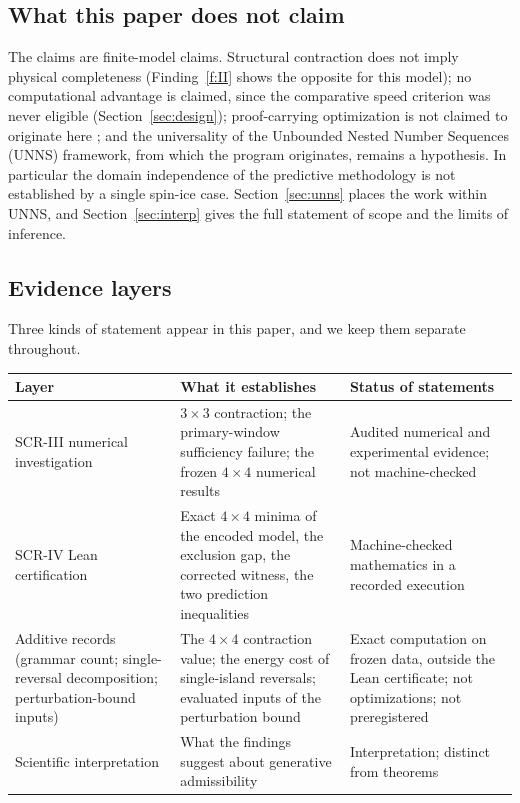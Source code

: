 \documentclass[11pt,a4paper]{article}
\theoremstyle{plain}
\theoremstyle{definition}
\theoremstyle{remark}
\begin{document}
\subsection{What this paper does not claim}
The claims are finite-model claims. Structural contraction does not imply physical completeness (Finding~\ref{f:II} shows the opposite for this model); no computational advantage is claimed, since the comparative speed criterion was never eligible (Section~\ref{sec:design}); proof-carrying optimization is not claimed to originate here \cite{Necula1997}; and the universality of the Unbounded Nested Number Sequences (UNNS) framework, from which the program originates, remains a hypothesis. In particular the domain independence of the predictive methodology is not established by a single spin-ice case. Section~\ref{sec:unns} places the work within UNNS, and Section~\ref{sec:interp} gives the full statement of scope and the limits of inference.

\subsection{Evidence layers}
Three kinds of statement appear in this paper, and we keep them separate throughout.

\begin{center}\small
\begin{tabularx}{0.96\linewidth}{@{}p{3.4cm}Xp{3.6cm}@{}}
\toprule
Layer & What it establishes & Status of statements\\
\midrule
SCR-III numerical investigation & $3\times3$ contraction; the primary-window sufficiency failure; the frozen $4\times4$ numerical results & Audited numerical and experimental evidence; not machine-checked\\[0.3em]
SCR-IV Lean certification & Exact $4\times4$ minima of the encoded model, the exclusion gap, the corrected witness, the two prediction inequalities & Machine-checked mathematics in a recorded execution\\[0.3em]
Additive records (grammar count; single-reversal decomposition; perturbation-bound inputs) & The $4\times4$ contraction value; the energy cost of single-island reversals; evaluated inputs of the perturbation bound & Exact computation on frozen data, outside the Lean certificate; not optimizations; not preregistered\\[0.3em]
Scientific interpretation & What the findings suggest about generative admissibility & Interpretation; distinct from theorems\\
\bottomrule
\end{tabularx}
\end{center}
\end{document}
